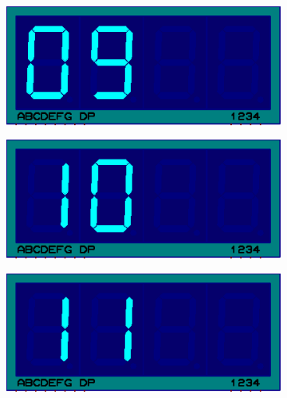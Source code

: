 \documentclass{lab_sheet}
\begin{document}
    \begin{figure}[H]\ContinuedFloat
        \begin{subfigure}{.33\textwidth}
          \centering
          \includegraphics[frame,width=.9\linewidth]{../Figures/d9}   
          \caption{}
          \label{fig:prob2-j}
        \end{subfigure}
        \begin{subfigure}{.33\textwidth}
          \centering
          \includegraphics[frame,width=.9\linewidth]{../Figures/d10}   
          \caption{}
          \label{fig:prob2-k}
        \end{subfigure}
        \begin{subfigure}{.33\textwidth}
          \centering
          \includegraphics[frame,width=.9\linewidth]{../Figures/d11}   
          \caption{}
          \label{fig:prob2-l}
        \end{subfigure}
        \newline
        \begin{subfigure}{.33\textwidth}

\end{subfigure}
\end{figure}
\end{document}
